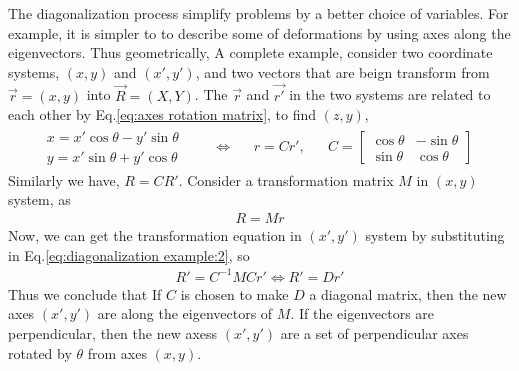             \bulletpar The diagonalization process simplify problems by a better choice of variables. For example, it is simpler to to describe some of deformations by 
            using axes along the eigenvectors. Thus geometrically, 
            \bulletpar A complete example, consider two coordinate systems, $(x, y)$ and $(x', y')$, and two vectors that are beign transform from $\vec{r}=(x, y)$ into
            $\vec{R}=(X, Y)$. The $\vec{r}$ and $\vec{r'}$ in the two systems are related to each other by Eq.\eqref{eq:axes rotation matrix}, to find $(z, y)$,
            \begin{align}
                \begin{aligned}
                    \label{eq:diagonalization example:1}
                    x = x' \cos{\theta} - y' \sin{\theta} \\
                    y = x' \sin{\theta} + y' \cos{\theta}
                \end{aligned} \qquad \Leftrightarrow \quad 
                \begin{aligned}
                    r = C r', && C = \begin{bmatrix}
                        \cos{\theta} & -\sin{\theta} \\ \sin{\theta} & \cos{\theta}
                    \end{bmatrix}
                \end{aligned}
            \end{align}
            Similarly we have, $R = C R'$. Consider a transformation matrix $M$ in $(x, y)$ system, as
            \begin{align}
                \label{eq:diagonalization example:2}
                R = M r
            \end{align}
            Now, we can get the transformation equation in $(x', y')$ system by substituting in Eq.\eqref{eq:diagonalization example:2}, so
            \begin{align}
                \label{eq:diagonalization example:3}
                R' = C^{-1} M C r' \Leftrightarrow R' = D r'
            \end{align}
            Thus we conclude that
            \starpar If $C$ is chosen to make $D$ a diagonal matrix, then the new axes $(x', y')$ are along the eigenvectors of $M$.
            If the eigenvectors are perpendicular, then the new axess $(x', y')$ are a set of perpendicular axes rotated by $\theta$ from 
            axes $(x, y)$.
            
